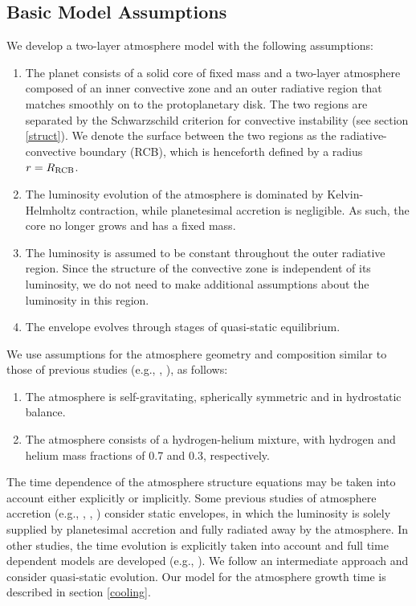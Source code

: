 \documentclass[apj]{emulateapj}
\newcommand{\cb}{_{\rm RCB}}
\begin{document}
\subsection{Basic Model Assumptions}
\label{model}

We develop a two-layer atmosphere model with the following assumptions:

\begin{enumerate}
\item The planet consists of a solid core of fixed mass and a two-layer atmosphere composed of an inner convective zone and an outer radiative region that matches smoothly on to the protoplanetary disk. The two regions are separated by the Schwarzschild criterion for convective instability (see section \ref{struct}). We denote the surface between the two regions as the radiative-convective boundary (RCB), which is henceforth defined by a radius $r=R\cb$.
\item The luminosity evolution of the atmosphere is dominated by Kelvin-Helmholtz contraction, while planetesimal accretion is negligible. As such, the core no longer grows and has a fixed mass.
\item The luminosity is assumed to be constant throughout the outer radiative region. Since the structure of the convective zone is independent of its luminosity, we do not need to make additional assumptions about the luminosity in this region.
\item The envelope evolves through stages of quasi-static equilibrium.
\end{enumerate} 

We use assumptions for the atmosphere geometry and composition similar to those of previous studies (e.g., \citealt{ikoma00}, \citealt{pn05}), as follows:

\begin{enumerate}
\item The atmosphere is self-gravitating, spherically symmetric and in hydrostatic balance.
\item The atmosphere consists of a hydrogen-helium mixture, with hydrogen and helium mass fractions of 0.7 and 0.3, respectively.
\end{enumerate}

The time dependence of the atmosphere structure equations may be taken into account either explicitly or implicitly. Some previous studies of atmosphere accretion (e.g., \citealt{stevenson82}, \citealt{wuchterl93}, \citealt{rafikov06}) consider static envelopes, in which the luminosity is solely supplied by planetesimal accretion and fully radiated away by the atmosphere. In other studies, the time evolution is explicitly taken into account and full time dependent models are developed (e.g., \citealt{ikoma00}). We follow an intermediate approach and consider quasi-static evolution. Our model for the atmosphere growth time is described in section \ref{cooling}. 
\end{document}
